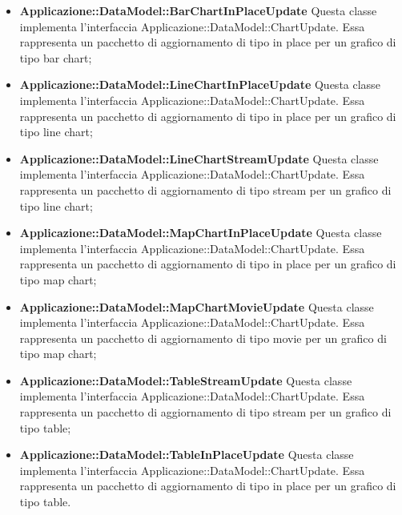 \begin{itemize}
		\item \textbf{Applicazione::DataModel::BarChartInPlaceUpdate} Questa classe implementa l'interfaccia Applicazione::DataModel::ChartUpdate. Essa rappresenta un pacchetto di aggiornamento di tipo in place per un grafico di tipo bar chart;

		\item \textbf{Applicazione::DataModel::LineChartInPlaceUpdate} Questa classe implementa l'interfaccia Applicazione::DataModel::ChartUpdate. Essa rappresenta un pacchetto di aggiornamento di tipo in place per un grafico di tipo line chart;

		\item \textbf{Applicazione::DataModel::LineChartStreamUpdate} Questa classe implementa l'interfaccia Applicazione::DataModel::ChartUpdate. Essa rappresenta un pacchetto di aggiornamento di tipo stream per un grafico di tipo line chart;

		\item \textbf{Applicazione::DataModel::MapChartInPlaceUpdate} Questa classe implementa l'interfaccia Applicazione::DataModel::ChartUpdate. Essa rappresenta un pacchetto di aggiornamento di tipo in place per un grafico di tipo map chart;

		\item \textbf{Applicazione::DataModel::MapChartMovieUpdate} Questa classe implementa l'interfaccia Applicazione::DataModel::ChartUpdate. Essa rappresenta un pacchetto di aggiornamento di tipo movie per un grafico di tipo map chart;

		\item \textbf{Applicazione::DataModel::TableStreamUpdate} Questa classe implementa l'interfaccia Applicazione::DataModel::ChartUpdate. Essa rappresenta un pacchetto di aggiornamento di tipo stream per un grafico di tipo table;

		\item \textbf{Applicazione::DataModel::TableInPlaceUpdate} Questa classe implementa l'interfaccia Applicazione::DataModel::ChartUpdate. Essa rappresenta un pacchetto di aggiornamento di tipo in place per un grafico di tipo table.
	\end{itemize}
